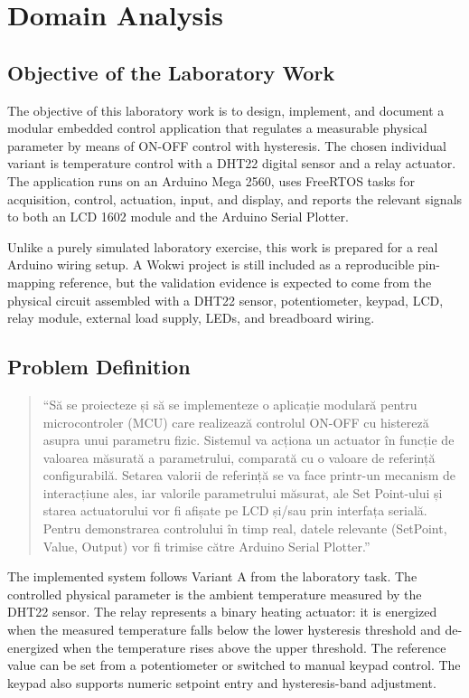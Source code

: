 \section{Domain Analysis}

\subsection{Objective of the Laboratory Work}

The objective of this laboratory work is to design, implement, and document a modular embedded control application that regulates a measurable physical parameter by means of ON-OFF control with hysteresis. The chosen individual variant is temperature control with a DHT22 digital sensor and a relay actuator. The application runs on an Arduino Mega 2560, uses FreeRTOS tasks for acquisition, control, actuation, input, and display, and reports the relevant signals to both an LCD 1602 module and the Arduino Serial Plotter.

Unlike a purely simulated laboratory exercise, this work is prepared for a real Arduino wiring setup. A Wokwi project is still included as a reproducible pin-mapping reference, but the validation evidence is expected to come from the physical circuit assembled with a DHT22 sensor, potentiometer, keypad, LCD, relay module, external load supply, LEDs, and breadboard wiring.

\subsection{Problem Definition}

\begin{quote}
\small
``Să se proiecteze și să se implementeze o aplicație modulară pentru microcontroler (MCU) care realizează controlul ON-OFF cu histereză asupra unui parametru fizic. Sistemul va acționa un actuator în funcție de valoarea măsurată a parametrului, comparată cu o valoare de referință configurabilă. Setarea valorii de referință se va face printr-un mecanism de interacțiune ales, iar valorile parametrului măsurat, ale Set Point-ului și starea actuatorului vor fi afișate pe LCD și/sau prin interfața serială. Pentru demonstrarea controlului în timp real, datele relevante (SetPoint, Value, Output) vor fi trimise către Arduino Serial Plotter.''
\end{quote}

The implemented system follows Variant A from the laboratory task. The controlled physical parameter is the ambient temperature measured by the DHT22 sensor. The relay represents a binary heating actuator: it is energized when the measured temperature falls below the lower hysteresis threshold and de-energized when the temperature rises above the upper threshold. The reference value can be set from a potentiometer or switched to manual keypad control. The keypad also supports numeric setpoint entry and hysteresis-band adjustment.


